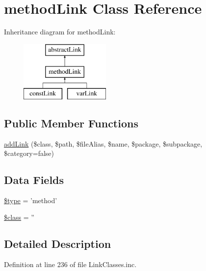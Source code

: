 \hypertarget{classmethod_link}{\section{method\-Link \-Class \-Reference}
\label{classmethod_link}
}
\-Inheritance diagram for method\-Link\-:\begin{figure}[H]
\begin{center}
\leavevmode
\includegraphics[height=3.000000cm]{classmethod_link}
\end{center}
\end{figure}
\subsection*{\-Public \-Member \-Functions}
\begin{DoxyCompactItemize}
\item 
\hyperlink{classmethod_link_a9698e285e2fc8c248699a617ecac1550}{add\-Link} (\$class, \$path, \$file\-Alias, \$name, \$package, \$subpackage, \$category=false)
\end{DoxyCompactItemize}
\subsection*{\-Data \-Fields}
\begin{DoxyCompactItemize}
\item 
\hyperlink{classmethod_link_a9a4a6fba2208984cabb3afacadf33919}{\$type} = 'method'
\item 
\hyperlink{classmethod_link_a252ba022809910ea710a068fc1bab657}{\$class} = ''
\end{DoxyCompactItemize}


\subsection{\-Detailed \-Description}


\-Definition at line 236 of file \-Link\-Classes.\-inc.



